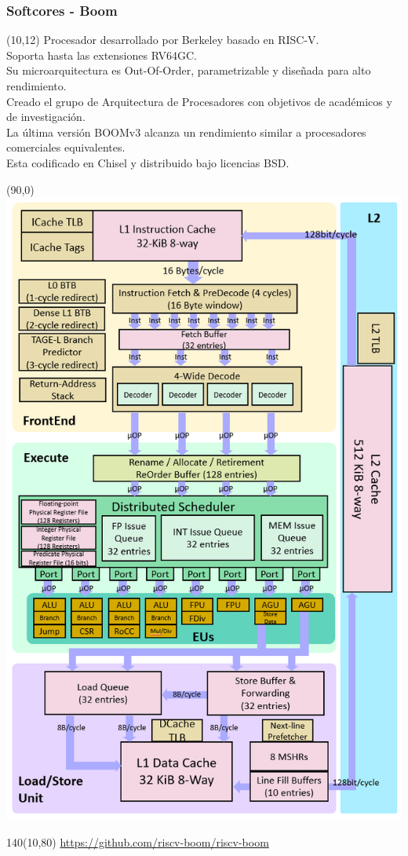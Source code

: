\documentclass[aspectratio=169]{beamer}
\begin{document}
\begin{frame}[t,fragile]
    \frametitle{Softcores - Boom}
    \begin{textblock}{70}(10,12) \footnotesize
    Procesador desarrollado por Berkeley basado en RISC-V.\\ Soporta hasta las extensiones RV64GC.\\
    \bigskip
    Su microarquitectura es Out-Of-Order, parametrizable y diseñada para alto rendimiento.\\
    \bigskip
    Creado el grupo de Arquitectura de Procesadores con objetivos de académicos y de investigación.\\
    \bigskip 
    La última versión BOOMv3 alcanza un rendimiento similar a procesadores comerciales equivalentes.\\
    \bigskip
    Esta codificado en Chisel y distribuido bajo licencias BSD.
    \end{textblock}
    \begin{textblock}{10}(90,0) \includegraphics[scale=0.32]{imgBmp/BOOM_uarch.png} \end{textblock}
    \begin{textblock}{140}(10,80) \footnotesize
    \url{https://github.com/riscv-boom/riscv-boom}
    \end{textblock}
\end{frame}
\end{document}
